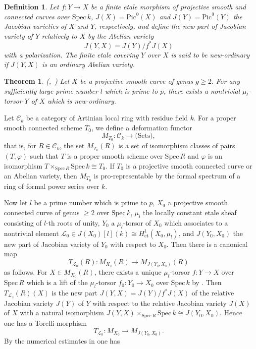 \documentclass[11pt]{amsart}
\newtheorem{theorem}[Lemma]{Theorem}
\newtheorem{definition}[Lemma]{Definition}
\begin{document}
\begin{definition}\label{newordtor} Let  $f : Y \rightarrow X$ be a finite etale morphism 
of projective smooth and connected curves over $\mathrm{Spec}\, k$, 
$J(X) = \mathrm{Pic}^0(X)$ and 
$J(Y) = \mathrm{Pic}^0(Y)$ the Jacobian varieties of $X$ and $Y$, respectively, and define 
the new part of Jacobian variety of $Y$ relatively to $X$ by the Abelian variety 
$$
       J(Y, X) = J(Y)/f^\ast J(X)  
$$
with a polarization. 
The finite etale covering $Y$ over $X$ is said to be new-ordinary if $J(Y, X)$ is an ordinary Abelian variety. 
\end{definition}

\begin{theorem}\label{neword} \mbox{\rm (\cite[Theorem 4.3.1]{ray}, \cite[Corollary 5.3]{tam})} 
Let $X$ be a projective smooth curve of genus $g \geq 2$. 
For any sufficiently large prime number $l$ which is prime to $p$, there exists a nontrivial 
$\mu_l$-torsor $Y$ of $X$ 
which is new-ordinary.  
\end{theorem} 

Let $\mathcal C_k$ be a category of Artinian local ring with residue field $k$. 
For a proper smooth connected scheme $T_0$, we define a deformation functor 
$$
      M_{T_0} : \mathcal C_k \rightarrow \mbox{(Sets)}, 
$$
that is, for $R \in \mathcal C_k$, the set $M_{T_0}(R)$ is a set of isomorphism classes of pairs $(T, \varphi)$ 
such that $T$ is a proper smooth scheme over $\mathrm{Spec}\, R$ and $\varphi$ is an isomorphism 
$T \times_{\mathrm{Spec}\, R}\mathrm{Spec}\, k \cong T_0$. If $T_0$ is a projective smooth connected curve 
or an Abelian variety, then $M_{T_0}$ is pro-representable by the formal spectrum of a ring of formal power series over $k$. 

Now let $l$ be a prime number which is prime to $p$, $X_0$ a projective smooth connected curve of genus $\geq 2$ 
over $\mathrm{Spec}\, k$, $\mu_l$ the locally constant etale sheaf consisting of $l$-th roots of unity, 
$Y_0$ a $\mu_l$-torsor of $X_0$ which associates to a nontrivial element $\mathcal L_0 \in J(X_0)[l](k) 
\cong H^1_{\mathrm{et}}(X_0, \mu_l)$, and $J(Y_0, X_0)$ the new part of Jacobian variety 
of $Y_0$ with respect to $X_0$. Then there is a canonical map 
$$
       T_{\mathcal L_0}(R) :  M_{X_0}(R) \rightarrow M_{J(Y_0, X_0)}(R)
$$
as follows. For $X \in M_{X_0}(R)$, there exists a unique $\mu_l$-torsor $f : Y \rightarrow X$ over $\mathrm{Spec}\, R$
which is a lift of the $\mu_l$-torsor $f_0 : Y_0 \rightarrow X_0$ over $\mathrm{Spec}\, k$ 
by \cite[I, Corollaire 8.4]{SGA1}. Then $T_{\mathcal L_0}(R)(X)$ 
is the new part $J(Y, X) = J(Y)/f^\ast J(X)$ of the relative Jacobian variety 
$J(Y)$ of $Y$ with respect to the relative Jacobian variety $J(X)$ of $X$ with a natural isomorphism 
$J(Y, X) \times_{\mathrm{Spec}\, R}\mathrm{Spec}\, k \cong J(Y_0, X_0)$. 
Hence one has a Torelli morphism 
$$
         T_{\mathcal L_0} : M_{X_0} \rightarrow M_{J(Y_0, X_0)}. 
$$
By the numerical estimates in \cite[Corollaries 4.7, 5.3]{tam} one has 
\end{document}
